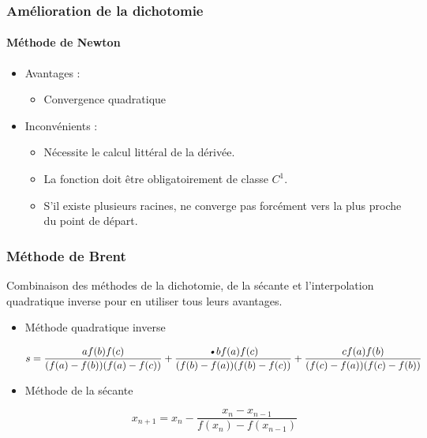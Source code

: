 \documentclass[french]{beamer}
\begin{document}
\begin{frame}
\frametitle{Amélioration de la dichotomie}
\framesubtitle{Méthode de Newton}

   \begin{itemize}
      \item Avantages :
         \begin{itemize}
            \item Convergence quadratique
         \end{itemize}
      \item Inconvénients :
      \begin{itemize}
         \item Nécessite le calcul littéral de la dérivée.
         \item La fonction doit être obligatoirement de classe $C^1$.
         \item S'il existe plusieurs racines, ne converge pas forcément vers la plus proche du point de départ.
      \end{itemize}
   \end{itemize}
\end{frame}


\begin{frame}
\frametitle{Méthode de Brent}

Combinaison des méthodes de la dichotomie, de la sécante et l'interpolation quadratique inverse pour en utiliser tous leurs avantages.

   \begin{itemize}
      \item Méthode quadratique inverse

      \begin{equation}
         s = \frac{af(b)f(c)}{(f(a)-f(b))(f(a)-f(c))} 
  + \frac{\textsl{•}bf(a)f(c)}{(f(b)-f(a))(f(b)-f(c))}
  + \frac{cf(a)f(b)}{(f(c)-f(a))(f(c)-f(b))}
     \end{equation}

     \item Méthode de la sécante

     \begin{equation}
        x_{n+1} = x_n - \frac{x_n - x_{n-1}}{f(x_n) - f(x_{n-1})}
     \end{equation}

   \end{itemize}
\end{frame}
\end{document}
